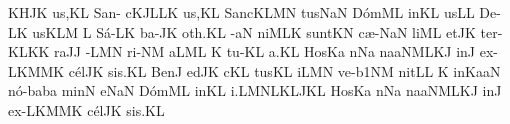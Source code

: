 

\gregorianFclef
{}
\Internote
\nosolesmescustos
\initiumgregorianum
{}%
\clivis KH\epiphonus JK\egn
\sgn {}u{s,}\punctum K\augmentum L\egn
\spatium
\Asteriscus
\divisiominima
\spatium
\sgn S{a}{n- c}\porrectus KJL\cephalicus LK\egn
{}u{s,}\punctum K\augmentum L\egn
\spatium
\divisiominima
\spatium
\sgn S{a}{nc}\pes KL\nonspatium\pes MN\egn
\sgn tus\torculus NaN\egn
\spatium
\sgn D{\'o}m\clivis ML\egn
\sgn {}in\pes KL\egn
\sgn {}us\punctum L\augmentum L\egn
\spatium
\divisiominima
\spatium
\sgn D{e}-\clivis LK\egn
\sgn {}us\Salicus KLM\egn
\spatium
\custos L
\lineaproxima
\sgn S{\'a}-\clivis LK\egn
\sgn ba-\pes JK\egn
\sgn {}o{th.}\punctum K\augmentum L\egn
\spatium
\divisiomaior
\spatium
{}-\clivis aN\egn
\sgn ni{}\climacus MLK\egn
\spatium
\sgn su{nt}\pes KN\egn
\spatium
\sgn c{\ae}-\torculus NaN\egn
\sgn li{}\clivis ML\egn
\spatium
\sgn {}et\epiphonus JK\egn
\spatium
\sgn t{e}{r-}\torculus KLK\punctum K\egn
\sgn ra{}\punctum J\augmentum J\egn
\spatium
\divisiominima
\spatium
{}-\Salicus LMN\egn
\sgn ri-\clivis NM\egn
\sgn {}a{}\torculus LML\egn
\spatium
\custos K
\lineaproxima
\sgn t{u}-\punctum K\augmentum L\egn
\sgn {}a.\punctum K\augmentum L\egn
\spatium
\divisiomaior
\spatium
\sgn Hos\pes Ka\egn
{}n\epiphonus Na\egn
\sgn na{}\CLimacus aNMLK\augmentum J\egn
\spatium
\sgn {}in\punctum J\egn
\spatium
\sgn {}e{x-}\porrectus LKM\spatiumparvum\clivis MK\egn
\sgn c{\'e}l\epiphonus JK\egn
\sgn si{s.}\punctum K\augmentum L\egn
\spatium
\divisiomaior
\spatium
\sgn Ben\punctum J\egn
\sgn {}ed\pes JK\egn
\sgn {}{\'\i}c\pes KL\egn
\sgn tus\punctum K\augmentum L\egn
\spatium
{}i{}\Salicus LMN\egn
\spatium
\sgn v{e}-\episem b1\clivis NM\egn
\sgn nit\punctum L\augmentum L\egn
\spatium
\divisiominima
\spatium
\custos K
\lineaproxima
\sgn {}in\pes Ka\clivis aN\egn
\spatium
\sgn n{\'o}-\bmolle b\torculus aba\egn
\sgn min\punctum N\egn
\sgn {}e{}\torculus NaN\egn
\spatium
\sgn D{\'o}m\clivis ML\egn
\sgn {}in\pes KL\egn
\sgn {}i.\punctum L\nonspatium\pessubbipunctis MNLK\porrectus LJK\augmentum L\egn
\spatium
\divisiomaior
\spatium
\sgn Hos\pes Ka\egn
{}n\epiphonus Na\egn
\sgn na{}\CLimacus aNMLK\augmentum J\egn
\spatium
\sgn {}in\punctum J\egn
\spatium
\sgn {}e{x-}\porrectus LKM\spatiumparvum\clivis MK\egn
\sgn c{\'e}l\epiphonus JK\egn
\sgn si{s.}\punctum K\augmentum L\egn
\spatium
\Finisgregoriana
